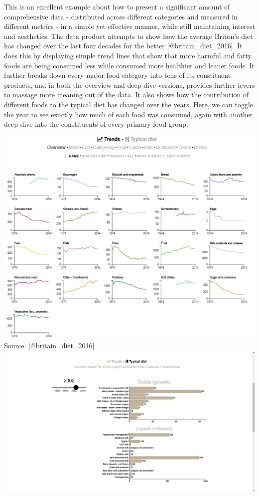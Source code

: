 \documentclass[]{book}
\theoremstyle{definition}
\theoremstyle{definition}
\theoremstyle{definition}
\theoremstyle{remark}
\begin{document}
This is an excellent example about how to present a significant amount
of comprehensive data - distributed across different categories and
measured in different metrics - in a simple yet effective manner, while
still maintaining interest and aesthetics. The data product attempts to
show how the average Briton's diet has changed over the last four
decades for the better {[}@britain\_diet\_2016{]}. It does this by
displaying simple trend lines that show that more harmful and fatty
foods are being consumed less while consumed more healthier and leaner
foods. It further breaks down every major food category into tens of its
constituent products, and in both the overview and deep-dive versions,
provides further levers to massage more meaning out of the data. It also
shows how the contribution of different foods to the typical diet has
changed over the years. Here, we can toggle the year to see exactly how
much of each food was consumed, again with another deep-dive into the
constituents of every primary food group.

\includegraphics{images/britain-diet-data-trends.PNG} Source:
{[}@britain\_diet\_2016{]}
\includegraphics{images/britain-diet-data-typical_diet.png}
\end{document}
